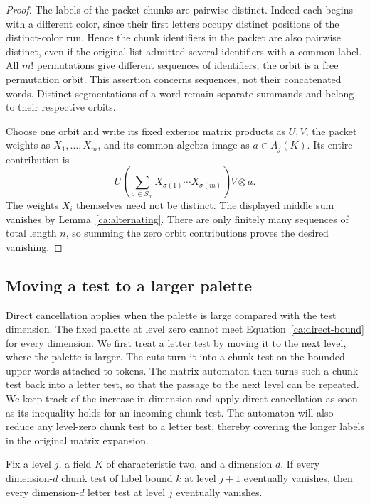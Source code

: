 \begin{proof}
The labels of the packet chunks are pairwise distinct.  Indeed each
begins with a different color, since their first letters occupy distinct
positions of the distinct-color run.  Hence the chunk identifiers in the
packet are also pairwise distinct, even if the original list admitted
several identifiers with a common label.  All $m!$ permutations give
different sequences of identifiers; the orbit is a free permutation
orbit.  This assertion concerns sequences, not their concatenated words.
Distinct segmentations of a word remain separate summands and belong to
their respective orbits.

Choose one orbit and write its fixed exterior matrix products as $U,V$,
the packet weights as $X_1,\ldots,X_m$, and its common algebra image as
$a\in A_j(K)$.  Its entire contribution is
\[
  U\left(\sum_{\sigma\in S_m}
      X_{\sigma(1)}\cdots X_{\sigma(m)}\right)V\otimes a.
\]
The weights $X_i$ themselves need not be distinct.  The displayed middle
sum vanishes by Lemma~\ref{ca:alternating}.  There are only finitely many
sequences of total length $n$, so summing the zero orbit contributions
proves the desired vanishing.
\end{proof}

\subsection{Moving a test to a larger palette}

Direct cancellation applies when the palette is large compared with the
test dimension. The fixed palette at level zero cannot meet
Equation~\eqref{ca:direct-bound} for every dimension. We first treat a
letter test by moving it to the next level, where the palette is larger.
The cuts turn
it into a chunk test on the bounded upper words attached to tokens. The
matrix automaton then turns such a chunk test back into a letter test, so
that the passage to the next level can be repeated. We keep track of the
increase in dimension and apply direct cancellation as soon as its
inequality holds for an incoming chunk test. The automaton will also
reduce any level-zero chunk test to a letter test, thereby covering the
longer labels in the original matrix expansion.

\begin{lemma}
\label{ca:cut-reduction}
Fix a level $j$, a field $K$ of characteristic two, and a dimension $d$.
If every dimension-$d$ chunk test of label bound $k$ at level $j+1$
eventually vanishes, then every dimension-$d$ letter test at level $j$
eventually vanishes.
\end{lemma}

